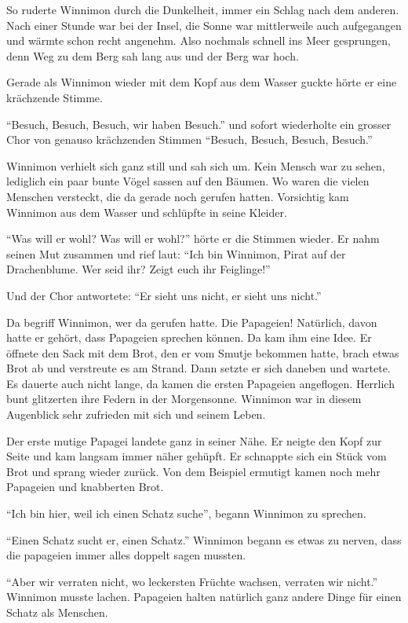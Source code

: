 So ruderte Winnimon durch die Dunkelheit, immer ein Schlag nach dem anderen. Nach einer Stunde war bei der Insel, die Sonne war mittlerweile auch aufgegangen und wärmte schon recht angenehm. Also nochmals schnell ins Meer gesprungen, denn Weg zu dem Berg sah lang aus und der Berg war hoch. 

Gerade als Winnimon wieder mit dem Kopf aus dem Wasser guckte hörte er eine krächzende Stimme.

\enquote{Besuch, Besuch, Besuch, wir haben Besuch.} und sofort wiederholte ein grosser Chor von genauso krächzenden Stimmen \enquote{Besuch, Besuch, Besuch, Besuch.}

Winnimon verhielt sich ganz still und sah sich um. Kein Mensch war zu sehen, lediglich ein paar bunte Vögel sassen auf den Bäumen. Wo waren die vielen Menschen versteckt, die da gerade noch gerufen hatten. Vorsichtig kam Winnimon aus dem Wasser und schlüpfte in seine Kleider.

\enquote{Was will er wohl? Was will er wohl?} hörte er die Stimmen wieder. Er nahm seinen Mut zusammen und rief laut: \enquote{Ich bin Winnimon, Pirat auf der Drachenblume. Wer seid ihr? Zeigt euch ihr Feiglinge!}

Und der Chor antwortete: \enquote{Er sieht uns nicht, er sieht uns nicht.}

Da begriff Winnimon, wer da gerufen hatte. Die Papageien! Natürlich, davon hatte er gehört, dass Papageien sprechen können. Da kam ihm eine Idee. Er öffnete den Sack mit dem Brot, den er vom Smutje bekommen hatte, brach etwas Brot ab und verstreute es am Strand. Dann setzte er sich daneben und wartete. Es dauerte auch nicht lange, da kamen die ersten Papageien angeflogen. Herrlich bunt glitzerten ihre Federn in der Morgensonne. Winnimon war in diesem Augenblick sehr zufrieden mit sich und seinem Leben.

Der erste mutige Papagei landete ganz in seiner Nähe. Er neigte den Kopf zur Seite und kam langsam immer näher gehüpft. Er schnappte sich ein Stück vom Brot und sprang wieder zurück. Von dem Beispiel ermutigt kamen noch mehr Papageien und knabberten Brot. 

\enquote{Ich bin hier, weil ich einen Schatz suche}, begann Winnimon zu sprechen. 

\enquote{Einen Schatz sucht er, einen Schatz.} Winnimon begann es etwas zu nerven, dass die papageien immer alles doppelt sagen mussten.

\enquote{Aber wir verraten nicht, wo leckersten Früchte wachsen, verraten wir nicht.} Winnimon musste lachen. Papageien halten natürlich ganz andere Dinge für einen Schatz als Menschen.

